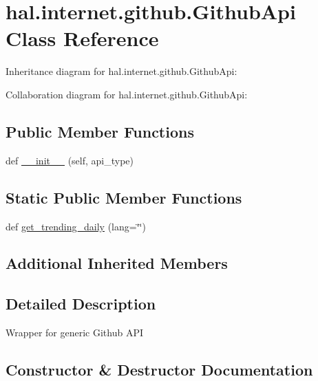 \hypertarget{classhal_1_1internet_1_1github_1_1_github_api}{}\section{hal.\+internet.\+github.\+Github\+Api Class Reference}
\label{classhal_1_1internet_1_1github_1_1_github_api}


Inheritance diagram for hal.\+internet.\+github.\+Github\+Api\+:


Collaboration diagram for hal.\+internet.\+github.\+Github\+Api\+:
\subsection*{Public Member Functions}
\begin{DoxyCompactItemize}
\item 
def \hyperlink{classhal_1_1internet_1_1github_1_1_github_api_ad2f707e9a64cf97c85867af8aa4a8a2e}{\+\_\+\+\_\+init\+\_\+\+\_\+} (self, api\+\_\+type)
\end{DoxyCompactItemize}
\subsection*{Static Public Member Functions}
\begin{DoxyCompactItemize}
\item 
def \hyperlink{classhal_1_1internet_1_1github_1_1_github_api_ae8a7db561cbff840da7be1f8630f12b2}{get\+\_\+trending\+\_\+daily} (lang=\char`\"{}\char`\"{})
\end{DoxyCompactItemize}
\subsection*{Additional Inherited Members}


\subsection{Detailed Description}
\begin{DoxyVerb}Wrapper for generic Github API \end{DoxyVerb}
 

\subsection{Constructor \& Destructor Documentation}
